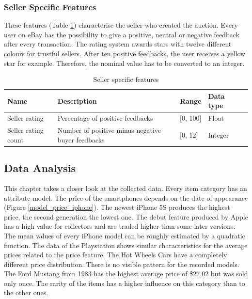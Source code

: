\subsubsection{Seller Specific Features}
These features (Table \ref{tab:seller_features}) characterise the seller who created the auction. Every user on eBay has the possibility to give a positive, neutral or negative feedback after every transaction. The rating system awards stars with twelve different colours for trustful sellers. After ten positive feedbacks, the user receives a yellow star for example. Therefore, the nominal value has to be converted to an integer.
\begin{table}[h!]
	\begin{center}
	\begin{tabular}{| p{2.6cm} | p{2.6cm} | p{2.6cm} | p{2.6cm} | p{2.6cm} |}
		\hline
		\textbf{Name} & \textbf{Description} &  \textbf{Range} & \textbf{Data type} \\
		\hline
		Seller rating & Percentage of positive feedbacks & [0, 100] & Float \\
		\hline
		Seller rating count & Number of positive minus negative buyer feedbacks & [0, 12] & Integer \\
		\hline
	\end{tabular}
	\end{center}
	\caption{Seller specific features}
	\label{tab:seller_features}
\end{table}
\subsection{Data Analysis}
This chapter takes a closer look at the collected data. Every item category has an attribute model. The price of the smartphones depends on the date of appearance (Figure \ref{model_price_iphone}). The newest iPhone 5S produces the highest price, the second generation the lowest one. The debut feature produced by Apple has a high value for collectors and are traded higher than some later versions. The mean values of every iPhone model can be roughly estimated by a quadratic function. The data of the Playstation shows similar characteristics for the average prices related to the price feature. The Hot Wheels Cars have a completely different price distribution. There is no visible pattern for the recorded models. The Ford Mustang from 1983 has the highest average price of \$27.02 but was sold only once. The rarity of the items has a higher influence on this category than to the other ones.

